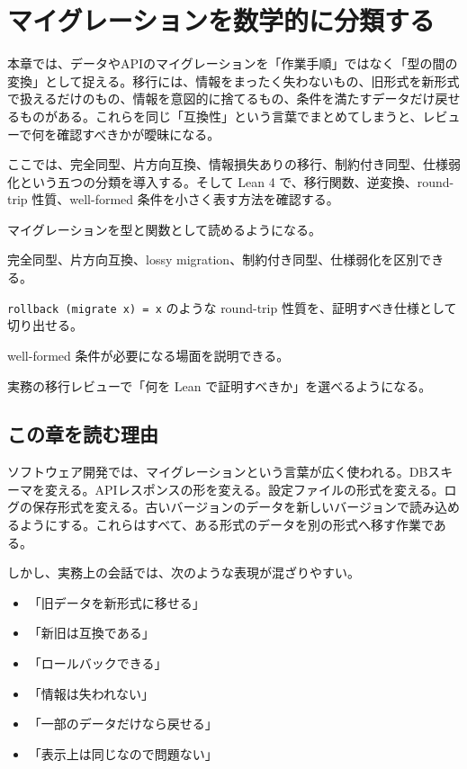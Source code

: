 \chapter{マイグレーションを数学的に分類する}
\label{chap:ch21-migration-classification}

\begin{chapterabstract}
本章では、データやAPIのマイグレーションを「作業手順」ではなく「型の間の変換」として捉える。移行には、情報をまったく失わないもの、旧形式を新形式で扱えるだけのもの、情報を意図的に捨てるもの、条件を満たすデータだけ戻せるものがある。これらを同じ「互換性」という言葉でまとめてしまうと、レビューで何を確認すべきかが曖昧になる。

ここでは、完全同型、片方向互換、情報損失ありの移行、制約付き同型、仕様弱化という五つの分類を導入する。そして Lean 4 で、移行関数、逆変換、round-trip 性質、well-formed 条件を小さく表す方法を確認する。
\end{chapterabstract}

\begin{learninggoals}
\item マイグレーションを型と関数として読めるようになる。
\item 完全同型、片方向互換、lossy migration、制約付き同型、仕様弱化を区別できる。
\item \texttt{rollback (migrate x) = x} のような round-trip 性質を、証明すべき仕様として切り出せる。
\item well-formed 条件が必要になる場面を説明できる。
\item 実務の移行レビューで「何を Lean で証明すべきか」を選べるようになる。
\end{learninggoals}

\section{この章を読む理由}

ソフトウェア開発では、マイグレーションという言葉が広く使われる。DBスキーマを変える。APIレスポンスの形を変える。設定ファイルの形式を変える。ログの保存形式を変える。古いバージョンのデータを新しいバージョンで読み込めるようにする。これらはすべて、ある形式のデータを別の形式へ移す作業である。

しかし、実務上の会話では、次のような表現が混ざりやすい。

\begin{itemize}
\item 「旧データを新形式に移せる」
\item 「新旧は互換である」
\item 「ロールバックできる」
\item 「情報は失われない」
\item 「一部のデータだけなら戻せる」
\item 「表示上は同じなので問題ない」
\end{itemize}

